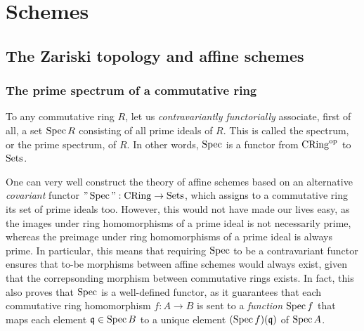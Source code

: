 \section{Schemes}
    \subsection{The Zariski topology and affine schemes}
        \subsubsection{The prime spectrum of a commutative ring} \index{$\Spec$}
            \begin{definition}
                To any commutative ring $R$, let us \textit{contravariantly functorially} associate, first of all, a set $\operatorname{Spec} R$ consisting of all prime ideals of $R$. This is called the spectrum, or the prime spectrum, of $R$. In other words, $\Spec$ is a functor from $\mathrm{CRing}^{\mathrm{op}}$ to $\mathrm{Sets}$.
            \end{definition}
            \begin{remark}
                One can very well construct the theory of affine schemes based on an alternative \textit{covariant} functor $"\operatorname{Spec}": \mathrm{CRing} \to \mathrm{Sets}$, which assigns to a commutative ring its set of prime ideals too. However, this would not have made our lives easy, as the images under ring homomorphisms of a prime ideal is not necessarily prime, whereas the preimage under ring homomorphisms of a prime ideal is always prime. In particular, this means that requiring $\Spec$ to be a contravariant functor ensures that to-be morphisms between affine schemes would always exist, given that the correpsonding morphism between commutative rings exists. In fact, this also proves that $\Spec$ is a well-defined functor, as it guarantees that each commutative ring homomorphism $f: A \to B$ is sent to a \textit{function} $\operatorname{Spec} f$ that maps each element $\mathfrak{q} \in \operatorname{Spec} B$ to a unique element $(\operatorname{Spec} f)(\mathfrak{q})$ of $\operatorname{Spec} A$.
            \end{remark}
